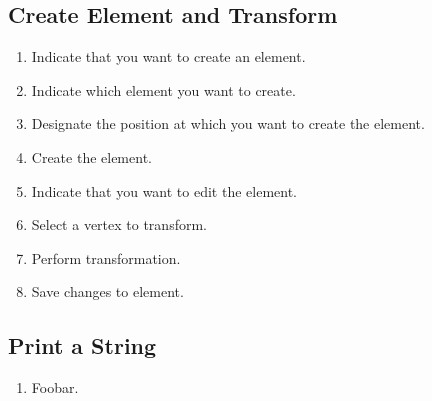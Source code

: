 \subsection{Create Element and Transform}
\label{app:euc_create_transform}

\begin{enumerate}
  \item Indicate that you want to create an element.
  \item Indicate which element you want to create.
  \item Designate the position at which you want to create the element.
  \item Create the element.
  \item Indicate that you want to edit the element.
  \item Select a vertex to transform.
  \item Perform transformation.
  \item Save changes to element.
\end{enumerate}

\subsection{Print a String}
\label{app:euc_print_string}

\begin{enumerate}
  \item Foobar. %
\end{enumerate}
